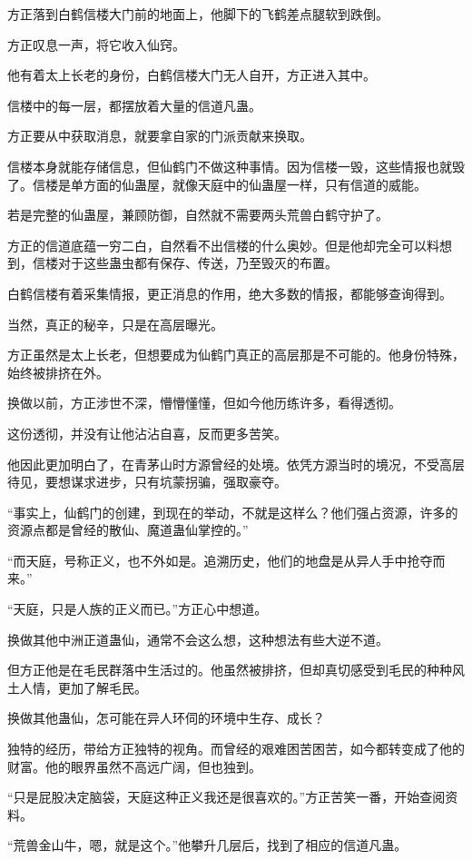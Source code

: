 \begin{this_body}
方正落到白鹤信楼大门前的地面上，他脚下的飞鹤差点腿软到跌倒。

方正叹息一声，将它收入仙窍。

他有着太上长老的身份，白鹤信楼大门无人自开，方正进入其中。

信楼中的每一层，都摆放着大量的信道凡蛊。

方正要从中获取消息，就要拿自家的门派贡献来换取。

信楼本身就能存储信息，但仙鹤门不做这种事情。因为信楼一毁，这些情报也就毁了。信楼是单方面的仙蛊屋，就像天庭中的仙蛊屋一样，只有信道的威能。

若是完整的仙蛊屋，兼顾防御，自然就不需要两头荒兽白鹤守护了。

方正的信道底蕴一穷二白，自然看不出信楼的什么奥妙。但是他却完全可以料想到，信楼对于这些蛊虫都有保存、传送，乃至毁灭的布置。

白鹤信楼有着采集情报，更正消息的作用，绝大多数的情报，都能够查询得到。

当然，真正的秘辛，只是在高层曝光。

方正虽然是太上长老，但想要成为仙鹤门真正的高层那是不可能的。他身份特殊，始终被排挤在外。

换做以前，方正涉世不深，懵懵懂懂，但如今他历练许多，看得透彻。

这份透彻，并没有让他沾沾自喜，反而更多苦笑。

他因此更加明白了，在青茅山时方源曾经的处境。依凭方源当时的境况，不受高层待见，要想谋求进步，只有坑蒙拐骗，强取豪夺。

“事实上，仙鹤门的创建，到现在的举动，不就是这样么？他们强占资源，许多的资源点都是曾经的散仙、魔道蛊仙掌控的。”

“而天庭，号称正义，也不外如是。追溯历史，他们的地盘是从异人手中抢夺而来。”

“天庭，只是人族的正义而已。”方正心中想道。

换做其他中洲正道蛊仙，通常不会这么想，这种想法有些大逆不道。

但方正他是在毛民群落中生活过的。他虽然被排挤，但却真切感受到毛民的种种风土人情，更加了解毛民。

换做其他蛊仙，怎可能在异人环伺的环境中生存、成长？

独特的经历，带给方正独特的视角。而曾经的艰难困苦困苦，如今都转变成了他的财富。他的眼界虽然不高远广阔，但也独到。

“只是屁股决定脑袋，天庭这种正义我还是很喜欢的。”方正苦笑一番，开始查阅资料。

“荒兽金山牛，嗯，就是这个。”他攀升几层后，找到了相应的信道凡蛊。


\end{this_body}
